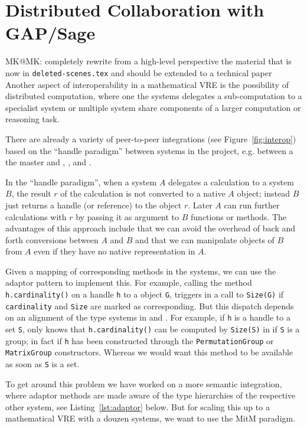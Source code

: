 \section{Distributed Collaboration with GAP/Sage}\label{sec:gapsage}
\begin{newpart}{MK@MK: completely rewrite from a high-level perspective the material that
    is now in \texttt{deleted-scenes.tex} and should be extended to a technical paper}
Another aspect of interoperability in a mathematical VRE is the possibility of distributed
computation, where one the systems delegates a sub-computation to a specialist system or
multiple system share components of a larger computation or reasoning task.

There are already a variety of peer-to-peer integrations (see Figure~\ref{fig:interop})
based on the ``handle paradigm'' between systems in the \ODK project, e.g. between \Sage a
the master and \GAP, \Singular, and \Pari. 

In the ``handle paradigm'', when a system $A$ delegates a calculation to a system $B$, the
result $r$ of the calculation is not converted to a native $A$ object; instead $B$ just
returns a handle (or reference) to the object $r$. Later $A$ can run further calculations
with $r$ by passing it as argument to $B$ functions or methods. The advantages of this
approach include that we can avoid the overhead of back and forth conversions between $A$
and $B$ and that we can manipulate objects of $B$ from $A$ even if they have no native
representation in $A$.

Given a mapping of corresponding methods in the systems, we can use the adaptor pattern to
implement this. For example, calling the method \texttt{h.cardinality()} on a \Sage handle
\texttt{h} to a \GAP object \texttt{G}, triggers in \GAP a call to \texttt{Size(G)} if
\texttt{cardinality} and \texttt{Size} are marked as corresponding. But this dispatch
depends on an alignment of the type systems in \Sage and \GAP. For example, if \texttt{h}
is a handle to a set \texttt{S}, \Sage only knows that \texttt{h.cardinality()} can be
computed by \texttt{Size(S)} in \GAP if \texttt{S} is a group; in fact if \texttt{h} has
been constructed through the \texttt{PermutationGroup} or \texttt{MatrixGroup}
constructors. Whereas we would want this method to be available as soon as \texttt{S} is a
set.

To get around this problem we have worked on a more semantic integration, where adaptor
methods are made aware of the type hierarchies of the respective other system, see
Listing~\ref{lst:adaptor} below. But for scaling this up to a mathematical VRE with a
douzen systems, we want to use the MitM paradigm.
 

\end{newpart}
